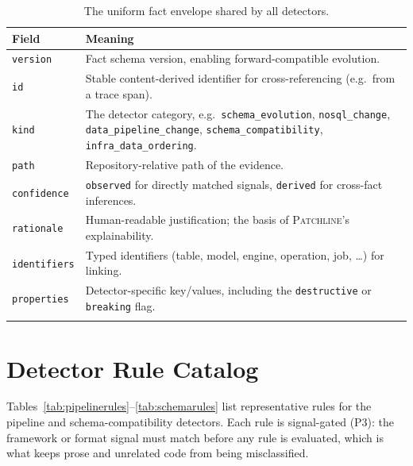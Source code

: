 \documentclass[11pt]{article}
\newcommand{\tool}{\textsc{Patchline}}
\newcommand{\code}[1]{\texttt{#1}}
\begin{document}
\begin{longtable}{>{\raggedright\arraybackslash}p{2.8cm}>{\raggedright\arraybackslash}p{11.2cm}}
\toprule
\textbf{Field} & \textbf{Meaning} \\
\midrule
\endhead
\code{version} & Fact schema version, enabling forward-compatible evolution. \\
\code{id} & Stable content-derived identifier for cross-referencing (e.g.\ from a trace span). \\
\code{kind} & The detector category, e.g.\ \code{schema\_evolution}, \code{nosql\_change},
\code{data\_pipeline\_change}, \code{schema\_compatibility}, \code{infra\_data\_ordering}. \\
\code{path} & Repository-relative path of the evidence. \\
\code{confidence} & \code{observed} for directly matched signals, \code{derived} for cross-fact
inferences. \\
\code{rationale} & Human-readable justification; the basis of \tool's explainability. \\
\code{identifiers} & Typed identifiers (table, model, engine, operation, job, \dots) for linking. \\
\code{properties} & Detector-specific key/values, including the \code{destructive} or \code{breaking}
flag. \\
\bottomrule
\caption{The uniform fact envelope shared by all detectors.}
\label{tab:factschema}
\end{longtable}

\section{Detector Rule Catalog}
\label{app:rules}

Tables~\ref{tab:pipelinerules}--\ref{tab:schemarules} list representative rules for the
pipeline and schema-compatibility detectors. Each rule is signal-gated (P3): the framework or format
signal must match before any rule is evaluated, which is what keeps prose and unrelated code from
being misclassified.
\end{document}
